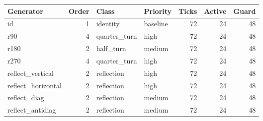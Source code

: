\begin{center}\scriptsize
\begin{tabular}{l r l l r r r}
\toprule
Generator & Order & Class & Priority & Ticks & Active & Guard\\
\midrule
id & 1 & identity & baseline & 72 & 24 & 48\\
r90 & 4 & quarter\_turn & high & 72 & 24 & 48\\
r180 & 2 & half\_turn & medium & 72 & 24 & 48\\
r270 & 4 & quarter\_turn & high & 72 & 24 & 48\\
reflect\_vertical & 2 & reflection & high & 72 & 24 & 48\\
reflect\_horizontal & 2 & reflection & high & 72 & 24 & 48\\
reflect\_diag & 2 & reflection & medium & 72 & 24 & 48\\
reflect\_antidiag & 2 & reflection & medium & 72 & 24 & 48\\
\bottomrule
\end{tabular}
\end{center}
